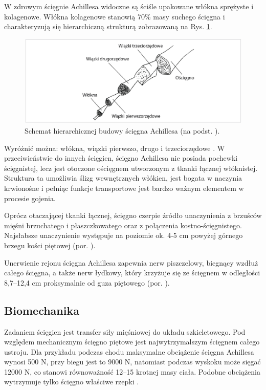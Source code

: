 W zdrowym ścięgnie Achillesa widoczne są ściśle upakowane włókna sprężyste \linebreak i kolagenowe. Włókna kolagenowe stanowią 70\% masy suchego ścięgna i charakteryzują się hierarchiczną strukturą zobrazowaną na Rys. \ref{Achilles-histology}.  
\begin{figure}[h!]
	\centering
	\includegraphics[width=1\textwidth]{figures/Achilles_hist.png}
	\caption{Schemat hierarchicznej budowy ścięgna Achillesa (na podst. \cite{Sharma2006}).}
	\label{Achilles-histology}
\end{figure}

Wyróżnić można: włókna, wiązki pierwszo, drugo i trzeciorzędowe \cite{Sharma2006}. W przeciwieństwie do innych ścięgien, ścięgno Achillesa nie posiada pochewki ścięgnistej, lecz jest otoczone ościęgnem utworzonym z tkanki łącznej włóknistej. Struktura \linebreak ta umożliwia ślizg wewnętrznych włókien, jest bogata w naczynia krwionośne i pełniąc funkcje transportowe jest bardzo ważnym elementem w procesie gojenia. 

Oprócz otaczającej tkanki łącznej, ścięgno czerpie źródło unaczynienia z brzuśców mięśni brzuchatego i płaszczkowatego oraz z połączenia kostno-ścięgnistego. Najsłabsze unaczynienie występuje na poziomie ok. 4-5 cm powyżej górnego brzegu kości piętowej (por. \cite{bochenek2016anatomia}).

Unerwienie rejonu ścięgna Achillesa zapewnia nerw piszczelowy, biegnący wzdłuż całego ścięgna, a także nerw łydkowy, który krzyżuje się ze ścięgnem w odległości 8,7--12,4 cm proksymalnie od guza piętowego (por. \cite{bochenek2016anatomia}). 

\subsection{Biomechanika}
\label{Biomechanika}
Zadaniem ścięgien jest transfer siły mięśniowej do układu szkieletowego. Pod względem mechanicznym ścięgno piętowe jest najwytrzymalszym ścięgnem całego ustroju. Dla przykładu podczas chodu maksymalne obciążenie ścięgna Achillesa wynosi 500 N, przy biegu jest to 9000 N, natomiast podczas wyskoku może sięgać 12000 N, co stanowi równoważność 12--15 krotnej masy ciała. Podobne obciążenia wytrzymuje tylko ścięgno właściwe rzepki \cite{Etiologia}.

